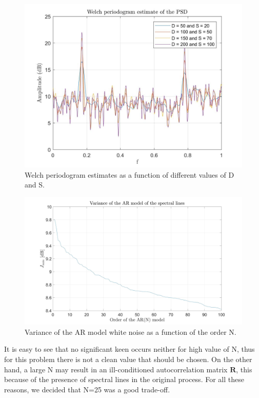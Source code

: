 \documentclass[a4paper,11pt,openright,twoside]{report}
\begin{document}
\begin{figure}
	\centering
	\includegraphics[width=14cm]{images/Welch_vs_SD.jpg}
	\caption{Welch periodogram estimates as a function of different values of D and S.}\label{WelchSD}
\end{figure}
\begin{figure}[h]
	\centering
	\includegraphics[width=14cm]{images/sigma_vs_N.jpg}
	\caption{Variance of the AR model white noise as a function of the order N.}\label{sigmavsN}
\end{figure}

It is easy to see that no significant keen occurs neither for high value of N, thus for this problem there is not a clean value that should be chosen. On the other hand, a large N may result in an ill-conditioned autocorrelation matrix $\mathbf{R}$, this because of the presence of spectral lines in the original process.
For all these reasons, we decided that N=25 was a good trade-off.
\end{document}
